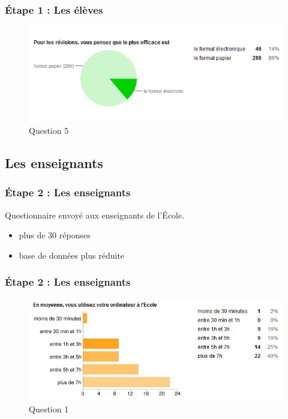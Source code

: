 \documentclass[slidetop,11pt]{beamer}
\begin{document}
\begin{frame} 
  \frametitle{\'Etape 1 : Les élèves}
  \begin{figure}[h!]
  \includegraphics[width=\textwidth]{i5.PNG}
  \caption{Question 5}
  \label{i5}
  \end{figure}
\end{frame}



\subsection{Les enseignants}

\begin{frame}[label=pagesimple]
  \frametitle{\'Etape 2 : Les enseignants}
  Questionnaire envoyé aux enseignants de l'\'Ecole.
  \begin{itemize}[<+->]
    \item plus de 30 réponses
    \item base de données plus réduite
    \end{itemize}
\end{frame}

\begin{frame} 
  \frametitle{\'Etape 2 : Les enseignants}
  \begin{figure}[h!]
  \includegraphics[width=\textwidth]{i6.PNG}
  \caption{Question 1}
  \label{i1}
  \end{figure}
\end{frame}
\end{document}
